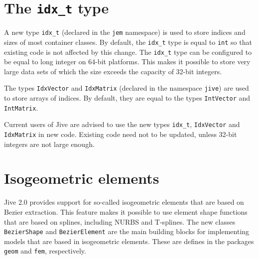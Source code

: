 \documentclass[a4paper]{article}
\newcommand{\Code}[1]{\texttt{#1}}
\begin{document}

\section{The \Code{idx\_t} type}

A new type \Code{idx\_t} (declared in the \Code{jem} namespace) is used
to store indices and sizes of most container classes. By default, the
\Code{idx\_t} type is equal to \Code{int} so that existing code is not
affected by this change. The \Code{idx\_t} type can be configured to be
equal to long integer on 64-bit platforms. This makes it possible to
store very large data sets of which the size exceeds the capacity of
32-bit integers.

The types \Code{IdxVector} and \Code{IdxMatrix} (declared in the
namespace \Code{jive}) are used to store arrays of indices. By default,
they are equal to the types \Code{IntVector} and \Code{IntMatrix}.

Current users of Jive are advised to use the new types \Code{idx\_t},
\Code{IdxVector} and \Code{IdxMatrix} in new code. Existing code need not
to be updated, unless 32-bit integers are not large enough.


\section{Isogeometric elements}

Jive 2.0 provides support for so-called isogeometric elements that are
based on Bezier extraction. This feature makes it possible to use element
shape functions that are based on splines, including NURBS and T-splines.
The new classes \Code{BezierShape} and \Code{BezierElement} are the main
building blocks for implementing models that are based in isogeometric
elements. These are defines in the packages \Code{geom} and \Code{fem},
respectively.
\end{document}
